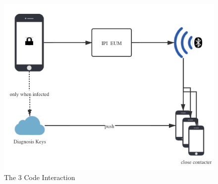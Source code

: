 \documentclass[11pt,en]{elegantpaper}
\begin{document}





\begin{figure}[h]
	\centering
	\includegraphics[width=0.7\linewidth]{figure/judge}
	\caption{The 3 Code Interaction}
	\label{fig:fig1}
\end{figure}
\end{document}
